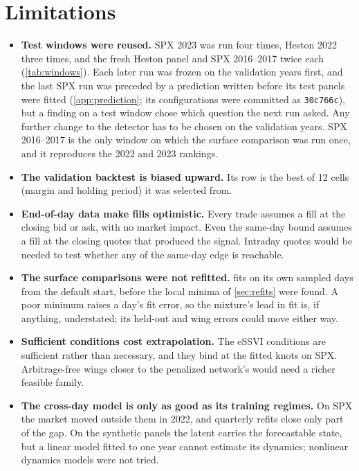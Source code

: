 \section{Limitations}
\label{sec:limitations}

\begin{itemize}
  \item \textbf{Test windows were reused.} SPX 2023 was run four times, Heston 2022 three times, and
  the fresh Heston panel and SPX 2016--2017 twice each (\cref{tab:windows}). Each later run was frozen
  on the validation years first, and the last SPX run was preceded by a prediction written before
  its test panels were fitted (\cref{app:prediction}; its configurations were committed as
  \texttt{30c766c}), but a finding on a test window chose which question the next run asked. Any further change to the
  detector has to be chosen on the validation years. SPX 2016--2017 is the only window on which the
  surface comparison was run once, and it reproduces the 2022 and 2023 rankings.
  \item \textbf{The validation backtest is biased upward.} Its row is the best of 12 cells (margin
  and holding period) it was selected from.
  \item \textbf{End-of-day data make fills optimistic.} Every trade assumes a fill at the closing
  bid or ask, with no market impact. Even the same-day bound assumes a fill at the closing quotes
  that produced the signal. Intraday quotes would be needed to test whether any of the same-day edge
  is reachable.
  \item \textbf{The surface comparisons were not refitted.}  fits \mixfour{} on its
  own sampled days from the default start, before the local minima of \cref{sec:refits} were found.
  A poor minimum raises a day's fit error, so the mixture's lead in fit is, if anything,
  understated; its held-out and wing errors could move either way.
  \item \textbf{Sufficient conditions cost extrapolation.} The eSSVI conditions are sufficient
  rather than necessary, and they bind at the fitted knots on SPX. Arbitrage-free wings closer to the
  penalized network's would need a richer feasible family.
  \item \textbf{The cross-day model is only as good as its training regimes.} On SPX the market
  moved outside them in 2022, and quarterly refits close only part of the gap. On the synthetic
  panels the latent carries the forecastable state, but a linear model fitted to one year cannot
  estimate its dynamics; nonlinear dynamics models were not tried.

\end{itemize}
